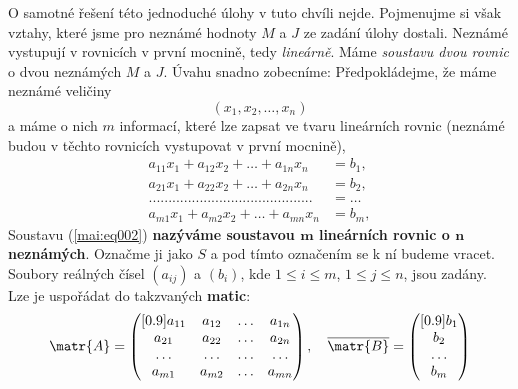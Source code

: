       O samotné řešení této jednoduché úlohy v tuto chvíli nejde. Pojmenujme si však vztahy, které
      jsme pro neznámé hodnoty \(M\) a \(J\) ze zadání úlohy dostali. Neznámé vystupují v rovnicích
      v první mocnině, tedy \emph{lineárně}. Máme \emph{soustavu dvou rovnic} o dvou neznámých \(M\)
      a \(J\). Úvahu snadno zobecníme: Předpokládejme, že máme neznámé veličiny
      \begin{equation*}
        (x_1, x_2, \ldots, x_n)
      \end{equation*}
      a máme o nich \(m\) informací, které lze zapsat ve tvaru lineárních rovnic (neznámé budou v
      těchto rovnicích vystupovat v první mocnině),
      \begin{align}
        a_{11}x_1 + a_{12}x_2 + \ldots + a_{1n}x_n &= b_1,     \nonumber           \\
        a_{21}x_1 + a_{22}x_2 + \ldots + a_{2n}x_n &= b_2,     \label{mai:eq002}   \\
        .......................................... &= \ldots   \nonumber           \\
        a_{m1}x_1 + a_{m2}x_2 + \ldots + a_{mn}x_n &= b_m,     \nonumber
      \end{align}
      Soustavu (\ref{mai:eq002}) \textbf{nazýváme soustavou \(\mathbf{m}\) lineárních rovnic o
      \(\mathbf{n}\) neznámých}. Označme ji jako \(S\) a pod tímto označením se k ní budeme vracet.
      Soubory reálných čísel \((a_{ij})\) a \((b_i)\), kde \(1 \leq i \leq m\), \(1 \leq j \leq n\),
      jsou zadány. Lze je uspořádat do takzvaných \textbf{matic}:
      \begingroup
        \renewcommand\arraycolsep{3pt}
        \begin{equation*}
          \matr{A} =
            \begin{pmatrix}[0.9]
              a_{11} & a_{12} & \ldots & a_{1n} \\
              a_{21} & a_{22} & \ldots & a_{2n} \\
              \ldots & \ldots & \ldots & \ldots \\
              a_{m1} & a_{m2} & \ldots & a_{mn}          
            \end{pmatrix},\quad
            \overline{\matr{B}} =
            \begin{pmatrix}[0.9]
              b_1     \\
              b_2     \\
              \ldots  \\
              b_m 
            \end{pmatrix}
        \end{equation*}
      \endgroup

